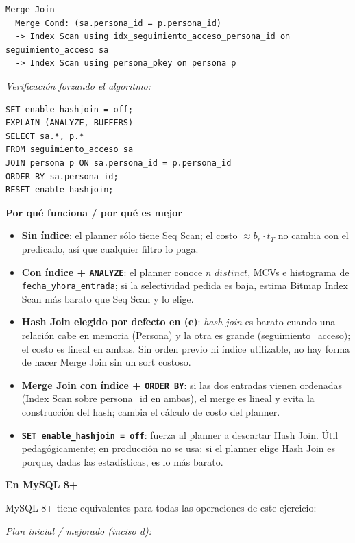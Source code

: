 \documentclass[11pt,a4paper]{article}
\newcommand{\itemcabecera}[1]{\noindent\textbf{#1}\par\medskip}
\newcommand{\bloquePorque}{\itemcabecera{Por qu\'e funciona / por qu\'e es mejor}}
\newcommand{\bloqueMySQL}{\itemcabecera{En MySQL 8+}}
\begin{document}
\begin{lstlisting}[style=shellstyle]
Merge Join
  Merge Cond: (sa.persona_id = p.persona_id)
  -> Index Scan using idx_seguimiento_acceso_persona_id on seguimiento_acceso sa
  -> Index Scan using persona_pkey on persona p
\end{lstlisting}

\textit{Verificación forzando el algoritmo:}

\begin{lstlisting}
SET enable_hashjoin = off;
EXPLAIN (ANALYZE, BUFFERS)
SELECT sa.*, p.*
FROM seguimiento_acceso sa
JOIN persona p ON sa.persona_id = p.persona_id
ORDER BY sa.persona_id;
RESET enable_hashjoin;
\end{lstlisting}

\bloquePorque

\begin{itemize}
    \item \textbf{Sin índice}: el planner sólo tiene Seq Scan; el costo $\approx b_r \cdot t_T$ no cambia con el predicado, así que cualquier filtro lo paga.
    \item \textbf{Con índice + \texttt{ANALYZE}}: el planner conoce $n\_distinct$, MCVs e histograma de \texttt{fecha\_yhora\_entrada}; si la selectividad pedida es baja, estima Bitmap Index Scan más barato que Seq Scan y lo elige.
    \item \textbf{Hash Join elegido por defecto en (e)}: \emph{hash join} es barato cuando una relación cabe en memoria (Persona) y la otra es grande (seguimiento\_acceso); el costo es lineal en ambas. Sin orden previo ni índice utilizable, no hay forma de hacer Merge Join sin un sort costoso.
    \item \textbf{Merge Join con índice + \texttt{ORDER BY}}: si las dos entradas vienen ordenadas (Index Scan sobre persona\_id en ambas), el merge es lineal y evita la construcción del hash; cambia el cálculo de costo del planner.
    \item \textbf{\texttt{SET enable\_hashjoin = off}}: fuerza al planner a descartar Hash Join. Útil pedagógicamente; en producción no se usa: si el planner elige Hash Join es porque, dadas las estadísticas, es lo más barato.
\end{itemize}

\bloqueMySQL

MySQL 8+ tiene equivalentes para todas las operaciones de este ejercicio:

\textit{Plan inicial / mejorado (inciso d):}
\end{document}
